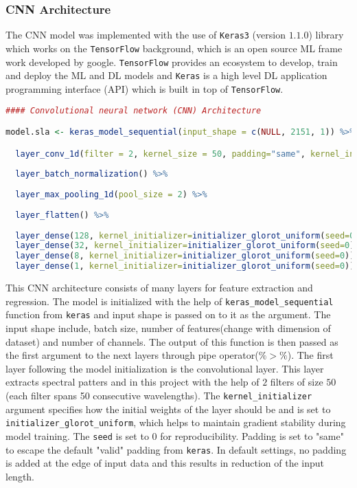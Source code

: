 \documentclass[12pt,a4paper]{report}
\begin{document}
\subsubsection*{CNN Architecture}
The CNN model was implemented with the use of \texttt{Keras3} (version $1.1.0$) library which works on the \texttt{TensorFlow} background, which is an open source ML frame work developed by google. \texttt{TensorFlow} provides an ecosystem to develop, train and deploy the ML and DL models and \texttt{Keras} is a high level DL application programming interface (API) which is built in top of \texttt{TensorFlow}. \\

\begin{lstlisting}[language=R, style=mystyle]
#### Convolutional neural network (CNN) Architecture

model.sla <- keras_model_sequential(input_shape = c(NULL, 2151, 1)) %>%

  layer_conv_1d(filter = 2, kernel_size = 50, padding="same", kernel_initializer=initializer_glorot_uniform(seed=0)) %>%
  
  layer_batch_normalization() %>%
  
  layer_max_pooling_1d(pool_size = 2) %>%
  
  layer_flatten() %>%
  
  layer_dense(128, kernel_initializer=initializer_glorot_uniform(seed=0)) %>%
  layer_dense(32, kernel_initializer=initializer_glorot_uniform(seed=0)) %>%
  layer_dense(8, kernel_initializer=initializer_glorot_uniform(seed=0)) %>%
  layer_dense(1, kernel_initializer=initializer_glorot_uniform(seed=0))
\end{lstlisting}

This CNN architecture consists of many layers for feature extraction and regression. The model is initialized with the help of \texttt{keras\_model\_sequential} function from \texttt{keras} and input shape is passed on to it as the argument. The input shape include, batch size, number of features(change with dimension of dataset) and number of channels. The output of this function is then passed as the first argument to the next layers through pipe operator($\%>\%$). The first layer following the model initialization is the convolutional layer. This layer extracts spectral patters and in this project with the help of $2$ filters of size $50$ (each filter spans 50 consecutive wavelengths). The \texttt{kernel\_initializer} argument specifies how the initial weights of the layer should be and is set to \texttt{initializer\_glorot\_uniform}, which helps to maintain gradient stability during model training. The \texttt{seed} is set to $0$ for reproducibility. Padding is set to "same" to escape the default "valid" padding from \texttt{keras}. In default settings, no padding is added at the edge of input data and this results in reduction of the input length.\\
\end{document}
